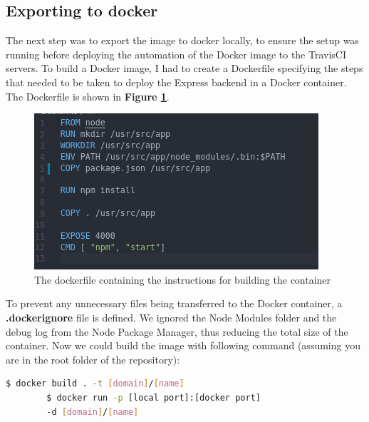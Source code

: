 \documentclass{paper}
\begin{document}
    \subsection{Exporting to docker}{
    The next step was to export the image to docker locally, to ensure the setup was
    running before deploying the automation of the Docker image to the TravisCI servers. To build a Docker image, I had to create
    a Dockerfile specifying the steps that needed to be taken to deploy the Express backend in a Docker container. The Dockerfile
    is shown in \textbf{Figure \ref{fig:dockerfile}}.
    \begin{figure}[!h]
        \centering
        \includegraphics[scale=3, pagebox=artbox]{Images/Dockerfile.png}
        \caption{The dockerfile containing the instructions for building the container}
        \label{fig:dockerfile}
    \end{figure}
    \newline
    To prevent any unnecessary files being transferred to the Docker container, a \textbf{.dockerignore} file is defined.
    We ignored the Node Modules folder and the debug log from the Node Package Manager, thus reducing the total size of 
    the container. Now we could build the image with following command (assuming you are in the root folder of the repository):
    \begin{lstlisting}[language=bash]
        $ docker build . -t [domain]/[name]
        $ docker run -p [local port]:[docker port] 
        -d [domain]/[name]
    \end{lstlisting}
    }    
    \newpage

\end{document}
